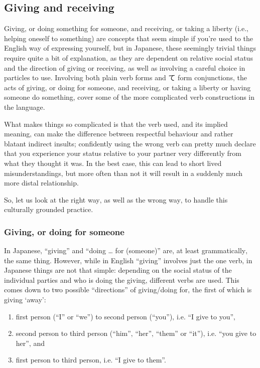 \documentclass[11pt, b5paper, twoside, openright, onecolumn]{book}
\begin{document}
\subsection{Giving and receiving}

Giving‚ or doing something for someone‚ and receiving‚ or taking a liberty (i.e.‚ helping oneself to something) are concepts that seem simple if you’re used to the English way of expressing yourself‚ but in Japanese‚ these seemingly trivial things require quite a bit of explanation‚ as they are dependent on relative social status and the direction of giving or receiving‚ as well as involving a careful choice in particles to use. Involving both plain verb forms and て form conjunctions‚ the acts of giving‚ or doing for someone‚ and receiving‚ or taking a liberty or having someone do something‚ cover some of the more complicated verb constructions in the language.

What makes things so complicated is that the verb used‚ and its implied meaning‚ can make the difference between respectful behaviour and rather blatant indirect insults; confidently using the wrong verb can pretty much declare that you experience your status relative to your partner very differently from what they thought it was. In the best case‚ this can lead to short lived misunderstandings‚ but more often than not it will result in a suddenly much more distal relationship.

So‚ let us look at the right way‚ as well as the wrong way‚ to handle this culturally grounded practice.

\subsubsection{Giving‚ or doing for someone}

In Japanese‚ “giving” and “doing … for (someone)” are‚ at least grammatically‚ the same thing. However‚ while in English “giving” involves just the one verb‚ in Japanese things are not that simple: depending on the social status of the individual parties and who is doing the giving‚ different verbs are used. This comes down to two possible “directions” of giving/doing for‚ the first of which is giving ‘away’:

\begin{enumerate}
\item first person (“I” or “we”) to second person (“you”)‚ i.e. “I give to you”‚
\item second person to third person (“him”‚ “her”‚ “them” or “it”)‚ i.e. “you give to her”‚ and
\item first person to third person‚ i.e. “I give to them”.
\end{enumerate}
\end{document}
